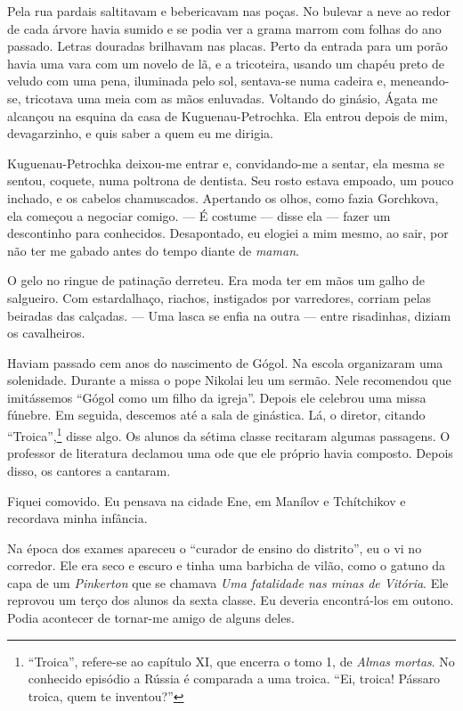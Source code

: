 Pela rua pardais saltitavam e bebericavam nas poças. No bulevar a neve
ao redor de cada árvore havia sumido e se podia ver a grama marrom com
folhas do ano passado. Letras douradas brilhavam nas placas. Perto da
entrada para um porão havia uma vara com um novelo de lã, e a
tricoteira, usando um chapéu preto de veludo com uma pena, iluminada
pelo sol, sentava-se numa cadeira e, meneando-se, tricotava uma meia com
as mãos enluvadas. Voltando do ginásio, Ágata me alcançou na esquina da
casa de Kuguenau-Petrochka. Ela entrou depois de mim, devagarzinho, e
quis saber a quem eu me dirigia.

Kuguenau-Petrochka deixou-me entrar e, convidando-me a sentar, ela mesma
se sentou, coquete, numa poltrona de dentista. Seu rosto estava empoado,
um pouco inchado, e os cabelos chamuscados. Apertando os olhos, como
fazia Gorchkova, ela começou a negociar comigo. --- É costume --- disse
ela --- fazer um descontinho para conhecidos. Desapontado, eu elogiei a
mim mesmo, ao sair, por não ter me gabado antes do tempo diante de
\emph{maman}.

O gelo no ringue de patinação derreteu. Era moda ter em mãos um galho de
salgueiro. Com estardalhaço, riachos, instigados por varredores, corriam
pelas beiradas das calçadas. --- Uma lasca se enfia na outra --- entre
risadinhas, diziam os cavalheiros.

Haviam passado cem anos do nascimento de Gógol. Na escola organizaram
uma solenidade. Durante a missa o pope Nikolai leu um sermão. Nele
recomendou que imitássemos ``Gógol como um filho da igreja''. Depois ele
celebrou uma missa fúnebre. Em seguida, descemos até a sala de
ginástica. Lá, o diretor, citando ``Troica'',\footnote{``Troica'',
  refere-se ao capítulo XI, que encerra o tomo 1, de \emph{Almas}
  \emph{mortas}. No conhecido episódio a Rússia é comparada a uma
  troica. ``Ei, troica! Pássaro troica, quem te inventou?''} disse algo.
Os alunos da sétima classe recitaram algumas passagens. O professor de
literatura declamou uma ode que ele próprio havia composto. Depois
disso, os cantores a cantaram.

Fiquei comovido. Eu pensava na cidade Ene, em Manílov e Tchítchikov e
recordava minha infância.

Na época dos exames apareceu o ``curador de ensino do distrito'', eu o
vi no corredor. Ele era seco e escuro e tinha uma barbicha de vilão,
como o gatuno da capa de um \emph{Pinkerton} que se chamava \emph{Uma
fatalidade nas minas de Vitória}. Ele reprovou um terço dos alunos da
sexta classe. Eu deveria encontrá-los em outono. Podia acontecer de
tornar-me amigo de alguns deles.

